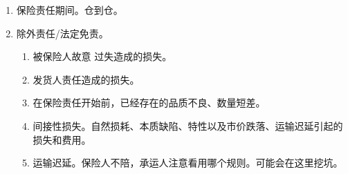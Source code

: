 \begin{enumerate}
  \item 保险责任期间。仓到仓。
  \item 除外责任/法定免责。
        \begin{enumerate}
          \item 被保险人故意 \hz 过失造成的损失。
          \item 发货人责任造成的损失。
          \item 在保险责任开始前，已经存在的品质不良、数量短差。
          \item 间接性损失。自然损耗、本质缺陷、特性以及市价跌落、运输迟延引起的损失和费用。
          \item 运输迟延。保险人不陪，承运人注意看用哪个规则。可能会在这里挖坑。
        \end{enumerate}
\end{enumerate}
